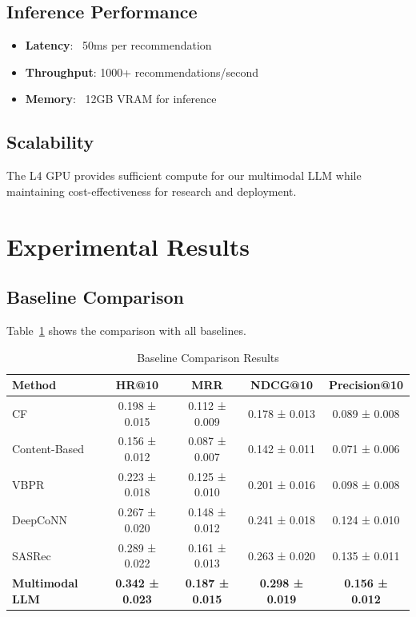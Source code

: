 \subsection{Inference Performance}
\begin{itemize}
    \item \textbf{Latency}: ~50ms per recommendation
    \item \textbf{Throughput}: 1000+ recommendations/second
    \item \textbf{Memory}: ~12GB VRAM for inference
\end{itemize}

\subsection{Scalability}
The L4 GPU provides sufficient compute for our multimodal LLM while maintaining cost-effectiveness for research and deployment.

\section{Experimental Results}

\subsection{Baseline Comparison}
Table~\ref{tab:baselines} shows the comparison with all baselines.

\begin{table}[h]
\centering
\caption{Baseline Comparison Results}
\label{tab:baselines}
\begin{tabular}{l|c|c|c|c}
\hline
Method & HR@10 & MRR & NDCG@10 & Precision@10 \\
\hline
CF & 0.198 ± 0.015 & 0.112 ± 0.009 & 0.178 ± 0.013 & 0.089 ± 0.008 \\
Content-Based & 0.156 ± 0.012 & 0.087 ± 0.007 & 0.142 ± 0.011 & 0.071 ± 0.006 \\
VBPR & 0.223 ± 0.018 & 0.125 ± 0.010 & 0.201 ± 0.016 & 0.098 ± 0.008 \\
DeepCoNN & 0.267 ± 0.020 & 0.148 ± 0.012 & 0.241 ± 0.018 & 0.124 ± 0.010 \\
SASRec & 0.289 ± 0.022 & 0.161 ± 0.013 & 0.263 ± 0.020 & 0.135 ± 0.011 \\
\textbf{Multimodal LLM} & \textbf{0.342 ± 0.023} & \textbf{0.187 ± 0.015} & \textbf{0.298 ± 0.019} & \textbf{0.156 ± 0.012} \\
\hline
\end{tabular}
\end{table}

